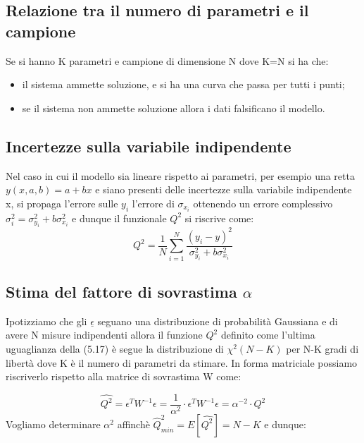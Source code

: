 \subsection{Relazione tra il numero di parametri e il campione}

Se si hanno K parametri e campione di dimensione N dove K=N  si ha che:

\begin{itemize}
	\item il sistema ammette soluzione, e si ha una curva che passa per tutti i punti;
	\item se il sistema non ammette soluzione allora i dati falsificano il modello.
\end{itemize}

\subsection{Incertezze sulla variabile indipendente}

Nel caso in cui il modello sia lineare rispetto ai parametri, per esempio una retta $y(x,a,b) = a +bx$ e siano presenti delle incertezze sulla variabile indipendente x, si propaga l'errore sulle $y_i$ l'errore di $\sigma_{x_{i}}$ ottenendo un errore complessivo $\sigma_{i}^2 = \sigma_{y_{i}}^2 + b \sigma_{x_{i}}^2$ e dunque il funzionale $Q^2$ si riscrive come:
\begin{equation}
	Q^2 = \dfrac{1}{N}\sum_{i=1}^N\dfrac{(y_i - y)^2}{\sigma_{y_{i}}^2 + b \sigma_{x_{i}}^2}
\end{equation}
\subsection{Stima del fattore di sovrastima $\alpha$}

Ipotizziamo che gli $\underline{\epsilon}$ seguano una distribuzione di probabilit\`{a} Gaussiana e di avere N misure indipendenti allora il funzione $Q^2$ definito come l'ultima uguaglianza della (5.17) \`{e} segue la distribuzione di $\chi^2(N-K)$ per N-K gradi di libert\`{a} dove K \`{e} il numero di parametri da stimare. In forma matriciale possiamo riscriverlo rispetto alla matrice di sovrastima W come:

\begin{equation}
	\hat{Q^{2}} = \epsilon^TW^{-1}\epsilon = \dfrac{1}{\alpha^2} \cdot \epsilon^TW^{-1}\epsilon = \alpha ^{-2}\cdot Q^2
\end{equation}
Vogliamo determinare $\alpha^2$ affinch\`{e} $\hat{Q}_{min}^{2} = E[\hat{Q^2}] = N-K$ e dunque:

